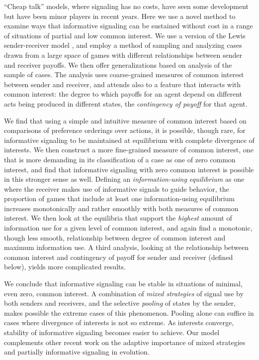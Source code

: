 \documentclass[10pt]{article}
\begin{document}
``Cheap talk'' models, where signaling has no costs, have seen some
development
\cite{Crawford1982, Farrell1996, Bergstrom1998, Silk2000, Bradbury2000, Wagner2012}
but have been minor players in recent years. Here we use a novel method
to examine ways that informative signaling can be sustained without cost
in a range of situations of partial and low common interest. We use a
version of the Lewis sender-receiver model
\cite{Lewis1969, Skyrms2010}, and employ a method of sampling and
analyzing cases drawn from a large space of games with different
relationships between sender and receiver payoffs. We then offer
generalizations based on analysis of the sample of cases. The analysis
uses coarse-grained measures of common interest between sender and
receiver, and attends also to a feature that interacts with common
interest: the degree to which payoffs for an agent depend on different
acts being produced in different states, the \emph{contingency of
payoff} for that agent.

We find that using a simple and intuitive measure of common interest
based on comparisons of preference orderings over actions, it is
possible, though rare, for informative signaling to be maintained at
equilibrium with complete divergence of interests. We then construct a
more fine-grained measure of common interest, one that is more demanding
in its classification of a case as one of zero common interest, and find
that informative signaling with zero common interest is possible in this
stronger sense as well. Defining an \emph{information-using equilibrium}
as one where the receiver makes use of informative signals to guide
behavior, the proportion of games that include at least one
information-using equilibrium increases monotonically and rather
smoothly with both measures of common interest. We then look at the
equilibria that support the \emph{highest} amount of information use for
a given level of common interest, and again find a monotonic, though
less smooth, relationship between degree of common interest and maximum
information use. A third analysis, looking at the relationship between
common interest and contingency of payoff for sender and receiver
(defined below), yields more complicated results.

We conclude that informative signaling can be stable in situations of
minimal, even zero, common interest. A combination of \emph{mixed
strategies} of signal use by both senders and receivers, and the
selective \emph{pooling} of states by the sender, makes possible the
extreme cases of this phenomenon. Pooling alone can suffice in cases
where divergence of interests is not so extreme. As interests converge,
stability of informative signaling becomes easier to achieve. Our model
complements other recent work on the adaptive importance of mixed
strategies and partially informative signaling in evolution.
\end{document}
